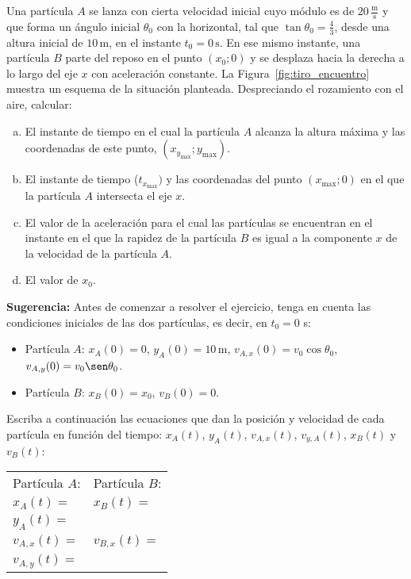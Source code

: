 \documentclass[addpoints]{exam}
\begin{document}
\begin{questions}
    \question Una partícula $A$ se lanza con cierta velocidad inicial cuyo módulo es de $20 \, \frac{\text{m}}{\text{s}}$ y que forma un ángulo inicial $\theta_0$ con la horizontal, tal que $\tan \theta_0 = \frac{4}{3}$, desde una altura inicial de $10 \, \text{m}$, en el instante $t_0 = 0 \, \text{s}$. En ese mismo instante, una partícula $B$ parte del reposo en el punto $(x_0;0)$ y se desplaza hacia la derecha a lo largo del eje $x$ con aceleración constante. La Figura~\ref{fig:tiro_encuentro} muestra un esquema de la situación planteada. Despreciando el rozamiento con el aire, calcular: \label{ej:encuentro_oblicuo}
    \begin{enumerate}[a)]
        \item El instante de tiempo en el cual la partícula $A$ alcanza la altura máxima y las coordenadas de este punto, $(x_{y_\text{max}}; y_\text{max})$.
        \item El instante de tiempo ($t_{x_\text{max}})$ y las coordenadas del punto $(x_\text{max};0)$ en el que la partícula $A$ intersecta el eje $x$.
        \item El valor de la aceleración para el cual las partículas se encuentran en el instante en el que la rapidez de la partícula $B$ es igual a la componente $x$ de la velocidad de la partícula $A$.
        \item El valor de $x_0$.
    \end{enumerate}

    \textbf{Sugerencia:} Antes de comenzar a resolver el ejercicio, tenga en cuenta las condiciones iniciales de las dos partículas, es decir, en $t_0 = 0$ s:
    \begin{itemize}
        \item Partícula $A$: $x_A (0) = 0$, $y_A (0) = 10 \, \text{m}$, $v_{A,x} (0) = v_0 \cos \theta_0$, $v_{A,y} (0) = v_0 \sen \theta_0$.
        \item Partícula $B$: $x_B (0) = x_0$, $v_{B} (0) = 0$.
    \end{itemize} Escriba a continuación las ecuaciones que dan la posición y velocidad de cada partícula en función del tiempo: $x_A (t)$, $y_A (t)$, $v_{A,x} (t)$, $v_{y,A} (t)$, $x_B (t)$ y $v_B (t)$:
    \begin{table}[ht]
        \centering
        \begin{tabular}{m{}m{}}
            Partícula $A$: & Partícula $B$: \\
            $x_A (t) = $ & $x_B (t) = $ \\
            $y_A (t) = $ &  \\
            $v_{A,x} (t) = $ & $v_{B,x} (t) = $ \\
            $v_{A,y} (t) = $ & \\ 
        \end{tabular}
    \end{table} 


\end{questions}
\end{document}
